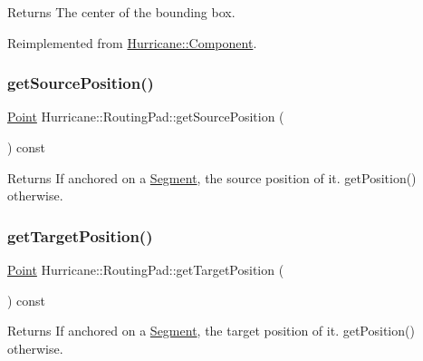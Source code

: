 \begin{DoxyReturn}{Returns}
The center of the bounding box. 
\end{DoxyReturn}


Reimplemented from \mbox{\hyperlink{classHurricane_1_1Component}{Hurricane\+::\+Component}}.

\mbox{\label{classHurricane_1_1RoutingPad_acc706fecb615230387a73ed8a7384c8e}} 
\subsubsection{\texorpdfstring{get\+Source\+Position()}{getSourcePosition()}}
{\footnotesize\ttfamily \mbox{\hyperlink{classHurricane_1_1Point}{Point}} Hurricane\+::\+Routing\+Pad\+::get\+Source\+Position (\begin{DoxyParamCaption}{ }\end{DoxyParamCaption}) const}

\begin{DoxyReturn}{Returns}
If anchored on a \mbox{\hyperlink{classHurricane_1_1Segment}{Segment}}, the source position of it. get\+Position() otherwise. 
\end{DoxyReturn}
\mbox{\label{classHurricane_1_1RoutingPad_a8de215adabb4a3330d02339c38dd6d4b}} 
\subsubsection{\texorpdfstring{get\+Target\+Position()}{getTargetPosition()}}
{\footnotesize\ttfamily \mbox{\hyperlink{classHurricane_1_1Point}{Point}} Hurricane\+::\+Routing\+Pad\+::get\+Target\+Position (\begin{DoxyParamCaption}{ }\end{DoxyParamCaption}) const}

\begin{DoxyReturn}{Returns}
If anchored on a \mbox{\hyperlink{classHurricane_1_1Segment}{Segment}}, the target position of it. get\+Position() otherwise. 
\end{DoxyReturn}
\mbox{\label{classHurricane_1_1RoutingPad_ae80e8f84f5806582905f6695f5cc43df}} 
